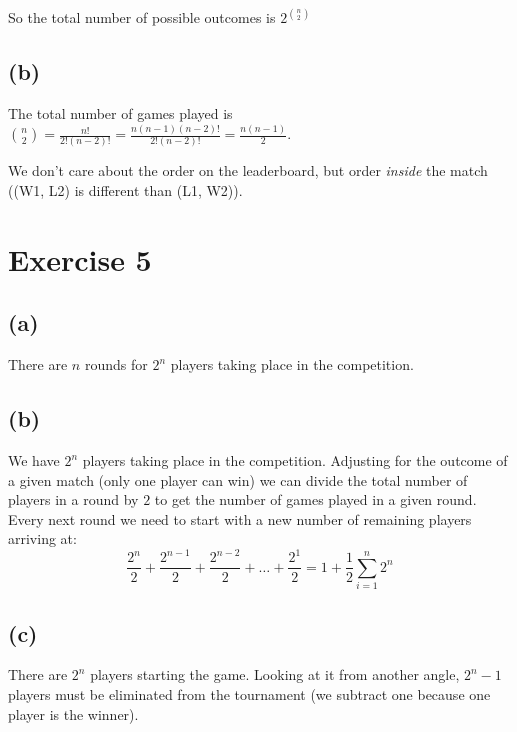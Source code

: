 \documentclass{article}
\begin{document}
So the total number of possible outcomes is \(2^{\binom{n}{2}}\)
\subsection*{(b)}
The total number of games played is \(\binom{n}{2} = \frac{n!}{2!(n - 2)!} = \frac{n(n-1)(n-2)!}{2!(n-2)!} = \frac{n(n-1)}{2}\).

We don't care about the order on the leaderboard, but order \emph{inside} the match
((W1, L2) is different than (L1, W2)).

\section*{Exercise 5}
\subsection*{(a)}
There are \(n\) rounds for \(2^n\) players taking place in the competition.

\subsection*{(b)}
We have \(2^n\) players taking place in the competition. Adjusting for the outcome of a given match (only one player can win)
we can divide the total number of players in a round by \(2\) to get the number of games played in a given round. Every next
round we need to start with a new number of remaining players arriving at:
\begin{equation*}
    \frac{2^n}{2} + \frac{2^{n-1}}{2} + \frac{2^{n-2}}{2} + \dots + \frac{2^1}{2} = 1 + \frac{1}{2} \sum_{i=1}^{n} 2^n 
\end{equation*}

\subsection*{(c)}
There are \(2^n\) players starting the game. Looking at it from another angle, \(2^{n} - 1\) players must be eliminated
from the tournament (we subtract one because one player is the winner).
\end{document}
